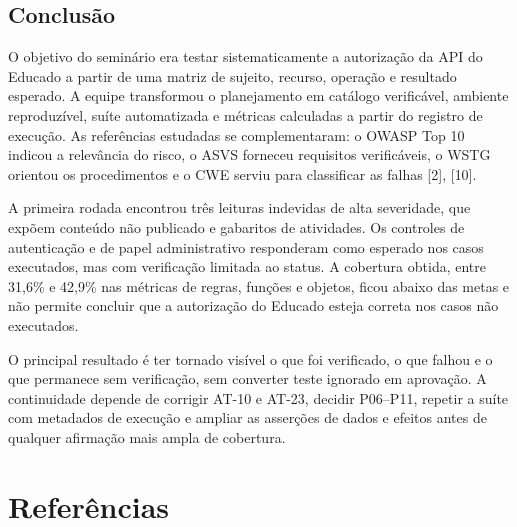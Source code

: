\subsection{Conclusão}\label{conclusuxe3o}

O objetivo do seminário era testar sistematicamente a autorização da API
do Educado a partir de uma matriz de sujeito, recurso, operação e
resultado esperado. A equipe transformou o planejamento em catálogo
verificável, ambiente reproduzível, suíte automatizada e métricas
calculadas a partir do registro de execução. As referências estudadas se
complementaram: o OWASP Top 10 indicou a relevância do risco, o ASVS
forneceu requisitos verificáveis, o WSTG orientou os procedimentos e o
CWE serviu para classificar as falhas {[}2{]}, {[}10{]}.

A primeira rodada encontrou três leituras indevidas de alta severidade,
que expõem conteúdo não publicado e gabaritos de atividades. Os
controles de autenticação e de papel administrativo responderam como
esperado nos casos executados, mas com verificação limitada ao status. A
cobertura obtida, entre 31,6\% e 42,9\% nas métricas de regras, funções
e objetos, ficou abaixo das metas e não permite concluir que a
autorização do Educado esteja correta nos casos não executados.

O principal resultado é ter tornado visível o que foi verificado, o que
falhou e o que permanece sem verificação, sem converter teste ignorado
em aprovação. A continuidade depende de corrigir AT-10 e AT-23, decidir
P06--P11, repetir a suíte com metadados de execução e ampliar as
asserções de dados e efeitos antes de qualquer afirmação mais ampla de
cobertura.

\section*{Referências}\label{bibliography}


